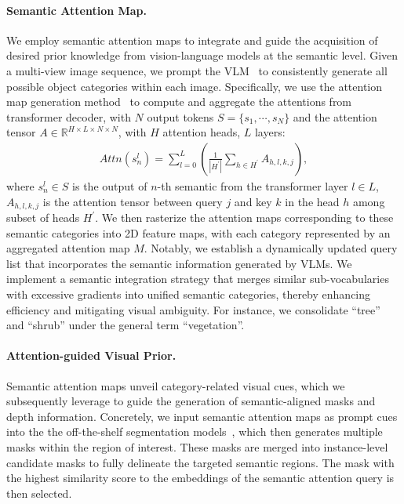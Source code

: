 \vspace{-4mm}
\paragraph{Semantic Attention Map.} 
We employ semantic attention maps to integrate and guide the acquisition of desired prior knowledge from vision-language models at the semantic level. Given a multi-view image sequence, we prompt the VLM~\cite{chen2024internvl} to consistently generate all possible object categories within each image. Specifically, we use the attention map generation method~\cite{abnar2020quantifying, lin2024training} to compute and aggregate the attentions from transformer decoder, with $N$ output tokens $ S = \{s_1, \cdots, s_N \} $ and the attention tensor $ A \in \mathbb{R}^{H \times L \times N \times N} $, with $H$ attention heads, $L$ layers:
\begin{equation}
\begin{aligned}
    Attn(s_n^{l}) = \sum_{l=0}^{L} (\frac{1}{|H^{\prime}|} \sum_{h \in H^{\prime}}A_{h,l,k,j}) ,
\end{aligned}
\end{equation}
where $s_n^l \in S$ is the output of $n$-th semantic from the transformer layer $l \in L$, $A_{h,l,k,j}$ is the attention tensor between query $j$ and key $k$ in the head $h$ among subset of heads $H^{\prime}$.
%
We then rasterize the attention maps corresponding to these semantic categories into 2D feature maps, with each category represented by an aggregated attention map $M$. Notably, we establish a dynamically updated query list that incorporates the semantic information generated by VLMs.
We implement a semantic integration strategy that merges similar sub-vocabularies with excessive gradients into unified semantic categories, thereby enhancing efficiency and mitigating visual ambiguity. For instance, we consolidate ``tree'' and ``shrub'' under the general term ``vegetation''.

\vspace{-4mm}
\paragraph{Attention-guided Visual Prior.} 
Semantic attention maps unveil category-related visual cues, which we subsequently leverage to guide the generation of semantic-aligned masks and depth information. Concretely, we input semantic attention maps as prompt cues into the the off-the-shelf segmentation models~\cite{zhao2023fast, zhang2023faster}, which then generates multiple masks within the region of interest. These masks are merged into instance-level candidate masks to fully delineate the targeted semantic regions. The mask with the highest similarity score to the embeddings of the semantic attention query is then selected.


